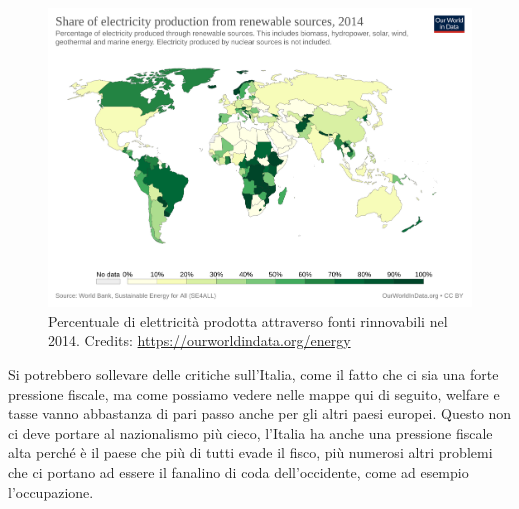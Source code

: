 \documentclass[12pt]{book} %
\begin{document}
\begin{figure}[H]
  \centering
  \includegraphics[width=0.95\linewidth]{images/Libro-img027.png}
  \caption{Percentuale di elettricità prodotta attraverso fonti rinnovabili nel 2014. 
Credits: \protect\url{https://ourworldindata.org/energy}}
\end{figure}

\bigskip

Si potrebbero sollevare delle critiche sull'Italia, come il fatto che ci sia una forte pressione
fiscale, ma come possiamo vedere nelle mappe qui di seguito, welfare e tasse vanno abbastanza di pari passo anche per
gli altri paesi europei. Questo non ci deve portare al nazionalismo più cieco, l'Italia ha anche
una pressione fiscale alta perché è il paese che più di tutti evade il fisco, più numerosi altri problemi che ci
portano ad essere il fanalino di coda dell'occidente, come ad esempio
l'occupazione.
\end{document}
